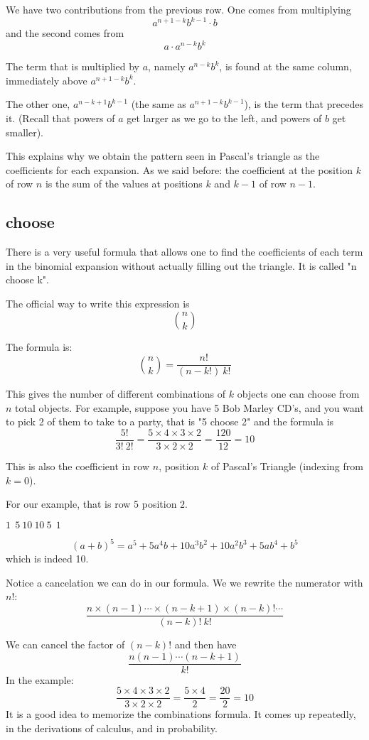 \documentclass[11pt, oneside]{article}
\begin{document}
We have two contributions from the previous row.  One comes from multiplying
\[ a^{n+1-k}b^{k-1} \cdot b \]
and the second comes from
\[ a \cdot a^{n-k}b^{k} \]

The term that is multiplied by $a$, namely $a^{n-k}b^{k}$, is found at the same column, immediately above $a^{n+1-k}b^{k}$.

The other one, $a^{n-k+1}b^{k-1}$ (the same as $a^{n+1-k}b^{k-1}$), is the term that precedes it.  (Recall that powers of $a$ get larger as we go to the left, and powers of $b$ get smaller).

This explains why we obtain the pattern seen in Pascal's triangle as the coefficients for each expansion.  As we said before:  the coefficient at the position $k$ of row $n$ is the sum of the values at positions $k$ and $k-1$ of row $n-1$.

\subsection*{choose}
There is a very useful formula that allows one to find the coefficients of each term in the binomial expansion without actually filling out the triangle.  It is called "n choose k".

The official way to write this expression is
\[  {{n}\choose{k}} \]

The formula is: 
\[  {{n}\choose{k}} = \frac{n!}{(n-k!) \ k!} \]

This gives the number of different combinations of $k$ objects one can choose from $n$ total objects.  For example, suppose you have 5 Bob Marley CD's, and you want to pick 2 of them to take to a party, that is "5 choose 2" and the formula is
\[ \frac{5!}{3! \ 2!} = \frac{5 \times 4 \times 3 \times 2 }{3 \times 2 \times 2} = \frac{120}{12} = 10 \]

This is also the coefficient in row $n$, position $k$ of Pascal's Triangle (indexing from $k=0$).  

For our example, that is row $5$ position $2$.

$1 \ \ 5 \ 10 \ 10 \ 5 \ \ 1$

\[ (a+b)^5 = a^5 + 5a^4b + 10a^3b^2 + 10a^2b^3 + 5ab^4 + b^5 \]
which is indeed 10.

Notice a cancelation we can do in our formula.  We we rewrite the numerator with $n!$:
\[ \frac{n \times (n-1) \cdots \times (n-k+1) \times (n-k)! \cdots}{(n-k)! \ k!}  \]

We can cancel the factor of $(n-k)!$ and then have
\[ \frac{n(n-1) \cdots (n-k+1)}{k!} \]
In the example:
\[ \frac{5 \times 4 \times 3 \times 2 }{3 \times 2 \times 2} = \frac{5 \times 4 }{2} = \frac{20}{2} = 10 \]
It is a good idea to memorize the combinations formula.  It comes up repeatedly, in the derivations of calculus, and in probability.  
\end{document}
